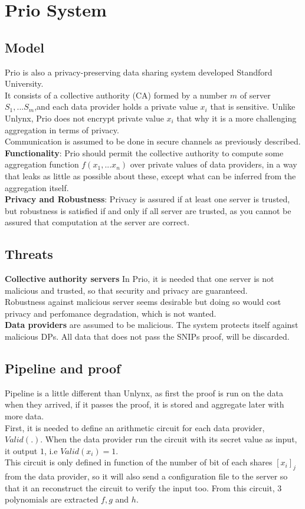 \documentclass{article}
\begin{document}
\section{Prio System}
\subsection{Model}
Prio is also a privacy-preserving data sharing system developed Standford University.\\
It consists of a collective authority (CA) formed by a number $m$ of server $S_1,...S_m$,and each data provider holds a private value $x_i$ that is sensitive. 
Unlike Unlynx, Prio does not encrypt private value $x_i$ that why it is a more challenging aggregation in terms of privacy.\\
Communication is assumed to be done in secure channels as previously described.\\
\textbf{Functionality}: Prio should permit the collective authority to compute some aggregation function $f(x_1,...x_n)$ over private values of data providers, in a way that leaks as little as possible about these, except what can be inferred from the aggregation itself.\\
\textbf{Privacy and Robustness}: Privacy is assured if at least one server is trusted, but robustness is satisfied if and only if all server are trusted, as you cannot be assured that computation at the server are correct.

\subsection{Threats}
\textbf{Collective authority servers} In Prio, it is needed that one server is not malicious and trusted, so that security and privacy are guaranteed.\\
Robustness against malicious server seems desirable but doing so would cost privacy and perfomance degradation, which is not wanted.\\
\textbf{Data providers} are assumed to be malicious. The system protects itself against malicious DPs. All data that does not pass the SNIPs proof, will be discarded.\\

\subsection{Pipeline and proof}
Pipeline is a little different than Unlynx, as first the proof is run on the data when they arrived, if it passes the proof, it is stored and aggregate later with more data.\\
First, it is needed to define an arithmetic circuit for each data provider, $Valid(.)$.
When the data provider run the circuit with its secret value as input, it output $1$, i.e $Valid(x_i)=1$.\\
This circuit is only defined in function of the number of bit of each shares $[x_i]_j$ from the data provider, so it will also send a configuration file to the server so that it an reconstruct the circuit to verify the input too. From this circuit, $3$ polynomials are extracted $f,g $ and $h$.\\
\end{document}
